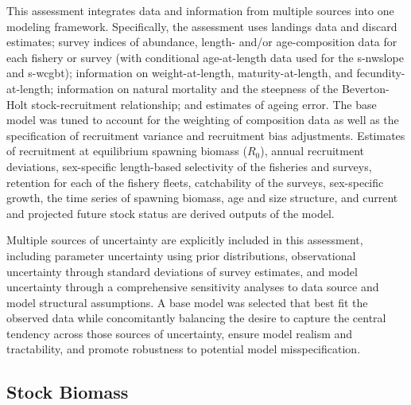 \documentclass[11pt,
  english,
  a4paper,
]{article}
\begin{document}
\leavevmode\tagmcend\tagstructend\par


This assessment integrates data and information from multiple sources into one modeling framework. Specifically, the assessment uses landings data and discard estimates; survey indices of abundance, length- and/or age-composition data for each fishery or survey (with conditional age-at-length data used for the \gls{s-nwslope} and \gls{s-wcgbt}); information on weight-at-length, maturity-at-length, and fecundity-at-length; information on natural mortality and the steepness of the Beverton-Holt stock-recruitment relationship; and estimates of ageing error. The base model was tuned to account for the weighting of composition data as well as the specification of recruitment variance and recruitment bias adjustments. Estimates of recruitment at equilibrium spawning biomass ({\(R_0\)\leavevmode\tagmcend\tagstructend}), annual recruitment deviations, sex-specific length-based selectivity of the fisheries and surveys, retention for each of the fishery fleets, catchability of the surveys, sex-specific growth, the time series of spawning biomass, age and size structure, and current and projected future stock status are derived outputs of the model.

\leavevmode\tagmcend\tagstructend\par


Multiple sources of uncertainty are explicitly included in this assessment, including parameter uncertainty using prior distributions, observational uncertainty through standard deviations of survey estimates, and model uncertainty through a comprehensive sensitivity analyses to data source and model structural assumptions. A base model was selected that best fit the observed data while concomitantly balancing the desire to capture the central tendency across those sources of uncertainty, ensure model realism and tractability, and promote robustness to potential model misspecification.

\leavevmode\tagmcend\tagstructend\par


\hypertarget{stock-biomass}{%
\subsection*{Stock Biomass}\label{stock-biomass}}
\end{document}
